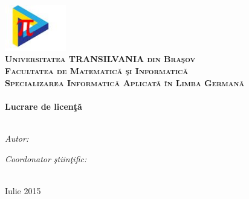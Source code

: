 \begin{titlepage}
\begin{center}
\includegraphics[width=0.2\textwidth]{./Pictures/LOGO.JPEG}\\[0.5cm]
\textsc{\LARGE \textbf{Universitatea TRANSILVANIA din Bra\c sov }}\\[0.5cm]
\textsc{\LARGE \textbf{Facultatea de Matematic\u a \c si Informatic\u a }}\\[0.5cm]
\textsc{\Large \textbf{Specializarea Informatic\u a Aplicat\u a \^ in Limba German\u a}}\\[3cm]

\HRule \\[0.4cm] %
{\LARGE \bfseries \textbf{Lucrare de licen\c t\u a}}\\[0.4cm] %
\HRule \\[1.5cm] %
 
\begin{minipage}{0.4\textwidth}
\begin{flushleft} \large
\emph{Autor:}\\
\authornames %
\end{flushleft}
\end{minipage}
\begin{minipage}{0.4\textwidth}
\begin{flushright} \large
\emph{Coordonator \c stiin\c tific:} \\
\supname %
\end{flushright}
\end{minipage}\\[8cm]
 


{\large Iulie 2015}\\[4cm] %
 
\vfill
\end{center}

\end{titlepage}

